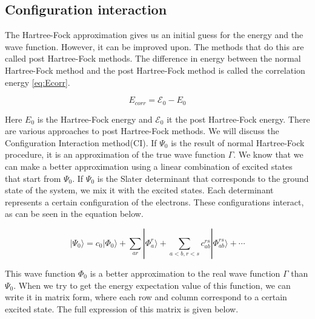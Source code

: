 \documentclass[twoside,twocolumn,9pt]{article}
\begin{document}
\subsection{Configuration interaction}
\label{subsec:cistheory}

The Hartree-Fock approximation gives us an initial guess for the energy and the wave function. However, it can be improved upon. The methods that do this are called post Hartree-Fock
methods. The difference in energy between the normal Hartree-Fock method and the post Hartree-Fock method is called the correlation energy \eqref{eq:Ecorr}.

\begin{equation}\label{eq:Ecorr}
  E_{corr} = \mathcal{E}_0 - E_0
\end{equation}

Here $E_0$ is the Hartree-Fock energy and $\mathcal{E}_0$ it the post Hartree-Fock energy. There are various approaches to post Hartree-Fock methods. We will discuss the
Configuration Interaction method(CI).
If $\Psi_0$ is the result of normal Hartree-Fock procedure, it is an approximation of the true wave function $\Gamma$. We know that we can make a better approximation
using a linear combination of excited states that start from $\Psi_0$\cite{Szabo1996}. If $\Psi_0$ is the Slater determinant that corresponds to the ground state of the system, we
mix it with the excited states. Each determinant represents a certain configuration of the electrons. These configurations interact, as can be seen in the equation below.

\begin{equation}\label{eq:lincomb}
  |\Psi_0\rangle = c_0|\Phi_0\rangle + \sum_{ar}|\Phi_a^r\rangle + \sum_{a<b,r<s}c_{ab}^{rs}|\Phi^{rs}_{ab} \rangle + \cdots
\end{equation}

This wave function $\Phi_0$ is a better approximation to the real wave function $\Gamma$ than $\Psi_0$. When we try to get the energy expectation value of this function, we can write
it in matrix form, where each row and column correspond to a certain excited state. The full expression of this matrix is given below.
\end{document}
